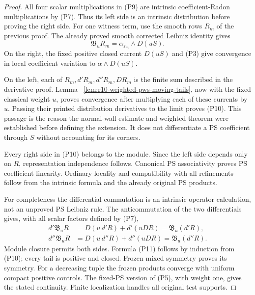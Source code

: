 \begin{proof}
All four scalar multiplications in (P9) are intrinsic
coefficient-Radon multiplications by (P7).  Thus its left
side is an intrinsic distribution before proving the right
side.  For one witness term, use the smooth rows $R_m$
of the previous proof.  The already proved smooth corrected
Leibniz identity gives
\[
                       \mathfrak B_uR_m
                         =\alpha_{\varepsilon_m}\wedge D(uS).
 \tag{P12}
\]
On the right, the fixed positive closed current $D(uS)$
and (P3) give convergence in local coefficient variation to
$\alpha\wedge D(uS)$.

On the left, each of $R_m,d'R_m,d''R_m,DR_m$ is the finite
sum described in the derivative proof.  Lemma
~\ref{lem:r10-weighted-pws-moving-tails}, now with the
fixed classical weight $u$, proves convergence after
multiplying each of these currents by $u$.  Passing their
printed distribution derivatives to the limit proves
(P10).  This passage is the reason the normal-wall estimate
and weighted theorem were established before defining the
extension.  It does not differentiate a PS coefficient
through $S$ without accounting for its corners.

Every right side in (P10) belongs to the module.  Since the
left side depends only on $R$, representation independence
follows.  Canonical PS associativity proves PS coefficient
linearity.  Ordinary locality and compatibility with all
refinements follow from the intrinsic formula and the
already original PS products.

For completeness the differential commutation is an
intrinsic operator calculation, not an unproved PS
Leibniz rule.  The anticommutation of the two differentials
gives, with all scalar factors defined by (P7),
\[
 \begin{split}
 d'\mathfrak B_uR
       &=D(u\,d'R)+d'(uDR)=\mathfrak B_u(d'R),\\
 d''\mathfrak B_uR
       &=D(u\,d''R)+d''(uDR)=\mathfrak B_u(d''R).
 \end{split}
 \tag{P13}
\]
Module closure permits both sides.  Formula (P11) follows
by induction from (P10); every tail is positive and closed.
Frozen mixed symmetry proves its symmetry.  For a decreasing
tuple the frozen products converge with uniform compact
positive controls.  The fixed-PS version of (P5), with
weight one, gives the stated continuity.  Finite localization
handles all original test supports.
\end{proof}

